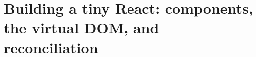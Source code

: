 \chapter{Building a tiny React: components, the virtual DOM, and reconciliation}
\label{ch:building-a-tiny-react-components-the}

